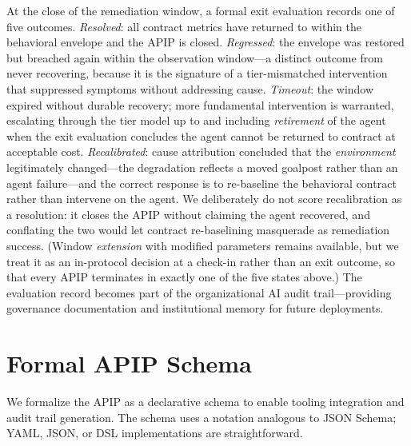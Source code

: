 \documentclass[conference]{IEEEtran}
\begin{document}
At the close of the remediation window, a formal exit evaluation records one
of five outcomes. \emph{Resolved}: all contract metrics have returned to
within the behavioral envelope and the APIP is closed. \emph{Regressed}: the
envelope was restored but breached again within the observation window---a
distinct outcome from never recovering, because it is the signature of a
tier-mismatched intervention that suppressed symptoms without addressing
cause. \emph{Timeout}: the window expired without durable recovery; more
fundamental intervention is warranted, escalating through the tier model up to
and including \emph{retirement} of the agent when the exit evaluation
concludes the agent cannot be returned to contract at acceptable cost.
\emph{Recalibrated}: cause attribution concluded that the \emph{environment}
legitimately changed---the degradation reflects a moved goalpost rather than
an agent failure---and the correct response is to re-baseline the behavioral
contract rather than intervene on the agent. We deliberately do not score
recalibration as a resolution: it closes the APIP without claiming the agent
recovered, and conflating the two would let contract re-baselining masquerade
as remediation success. (Window \emph{extension} with modified parameters
remains available, but we treat it as an in-protocol decision at a check-in
rather than an exit outcome, so that every APIP terminates in exactly one of
the five states above.) The evaluation record becomes part of the
organizational AI audit trail---providing governance documentation and
institutional memory for future deployments.
\section{Formal APIP Schema}
\label{sec:schema}

We formalize the APIP as a declarative schema to enable tooling integration and
audit trail generation. The schema uses a notation analogous to JSON Schema;
YAML, JSON, or DSL implementations are straightforward.
\end{document}
